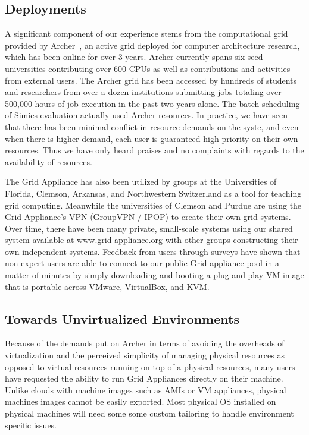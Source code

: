 \documentclass[twocolumn]{svjour3}
\begin{document}
\subsection{Deployments}

A significant component of our experience stems from the computational grid
provided by Archer~\cite{archer}, an active grid deployed for computer
architecture research, which has been online for over 3 years.  Archer
currently spans six seed universities contributing over 600 CPUs as well as
contributions and activities from external users.  The Archer grid has been
accessed by hundreds of students and researchers from over a dozen institutions
submitting jobs totaling over 500,000 hours of job execution in the past two
years alone.  The batch scheduling of Simics evaluation actually used Archer
resources.  In practice, we have seen that there has been minimal conflict in
resource demands on the syste, and even when there is higher demand, each user
is guaranteed high priority on their own resources.  Thus we have only heard
praises and no complaints with regards to the availability of resources.

The Grid Appliance has also been utilized by groups at the Universities of
Florida, Clemson, Arkansas, and Northwestern Switzerland as a tool for teaching
grid computing.  Meanwhile the universities of Clemson and Purdue are using the
Grid Appliance's VPN (GroupVPN / IPOP) to create their own grid systems.  Over
time, there have been many private, small-scale systems using our shared system
available at \url{www.grid-appliance.org} with other groups constructing their
own independent systems.  Feedback from users through surveys have shown that
non-expert users are able to connect to our public Grid appliance pool in a
matter of minutes by simply downloading and booting a plug-and-play VM image
that is portable across VMware, VirtualBox, and KVM.

\subsection{Towards Unvirtualized Environments}
\label{packaging}

Because of the demands put on Archer in terms of avoiding the overheads of
virtualization and the perceived simplicity of managing physical resources as
opposed to virtual resources running on top of a physical resources, many users
have requested the ability to run Grid Appliances directly on their machine.
Unlike clouds with machine images such as AMIs or VM appliances, physical
machines images cannot be easily exported.  Most physical OS installed on
physical machines will need some some custom tailoring to handle environment
specific issues.
\end{document}
